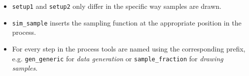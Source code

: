 \begin{Shaded}
\end{Shaded}

\begin{itemize}
\tightlist
\item
  \texttt{setup1} and \texttt{setup2} only differ in the specific way
  samples are drawn.
\item
  \texttt{sim\_sample} inserts the sampling function at the appropriate
  position in the process.
\item
  For every step in the process tools are named using the corresponding
  prefix, e.g. \texttt{gen\_generic} for \textit{data generation} or
  \texttt{sample\_fraction} for \textit{drawing samples}.
\end{itemize}
